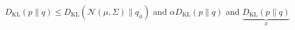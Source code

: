 \newcommand{\KL}[2]{D_{\mathrm{KL}}(#1 \| #2)}
$\KL{p}{q} \le \KL{\mathcal{N}(\mu,\Sigma)}{q_\phi}$ and $\alpha\KL p q$ and $\underbrace{\KL{p}{q}}_{x}$
